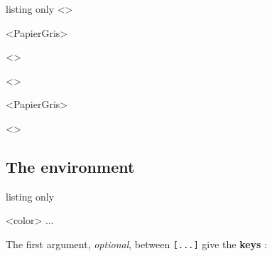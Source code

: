 \documentclass[a4paper]{article}
\newcommand\Cle[1]{{\bfseries\sffamily\textlangle #1\textrangle}}
\begin{document}
\medskip

\begin{PresentationCode}{listing only}
\DispGrid[NumSquares=18x4,Grid=Seyes,DispBar=false]<\ColSeyes>

\DispGrid[NumSquares=36x8,Enlarge=3/3]<PapierGris>

\begin{center}
	\DispGrid[NumSquares=12x3,Grid=Ruled,Margin=2]<\ColRuled>
\end{center}
\end{PresentationCode}

\medskip

\DispGrid[NumSquares=18x4,Grid=Seyes,DispBar=false]<\ColSeyes>

\medskip

\DispGrid[NumSquares=36x8,Enlarge=3/3]<PapierGris>

\smallskip

\begin{center}
	\DispGrid[NumSquares=12x3,Grid=Ruled,Margin=2]<\ColRuled>
\end{center}

\pagebreak

\subsection{The environment}

\begin{PresentationCode}{listing only}

\begin{EnvGrid}[keys]<color>
	...
\end{EnvGrid}
\end{PresentationCode}

The first argument, \textit{optional}, between \texttt{[...]} give the \Cle{keys} :
\end{document}

